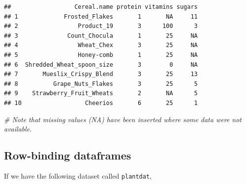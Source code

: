 \documentclass[]{book}
\newenvironment{Shaded}{\begin{snugshade}}{\end{snugshade}}
\newcommand{\CommentTok}[1]{\textcolor[rgb]{0.56,0.35,0.01}{\textit{#1}}}
\newcommand{\DataTypeTok}[1]{\textcolor[rgb]{0.13,0.29,0.53}{#1}}
\newcommand{\KeywordTok}[1]{\textcolor[rgb]{0.13,0.29,0.53}{\textbf{#1}}}
\newcommand{\NormalTok}[1]{#1}
\newcommand{\OperatorTok}[1]{\textcolor[rgb]{0.81,0.36,0.00}{\textbf{#1}}}
\newcommand{\StringTok}[1]{\textcolor[rgb]{0.31,0.60,0.02}{#1}}
\begin{document}
\begin{Shaded}
\end{Shaded}

\begin{verbatim}
##                  Cereal.name protein vitamins sugars
## 1             Frosted_Flakes       1       NA     11
## 2                 Product_19       3      100      3
## 3              Count_Chocula       1       25     NA
## 4                 Wheat_Chex       3       25     NA
## 5                 Honey-comb       1       25     NA
## 6  Shredded_Wheat_spoon_size       3        0     NA
## 7       Mueslix_Crispy_Blend       3       25     13
## 8          Grape_Nuts_Flakes       3       25      5
## 9    Strawberry_Fruit_Wheats       2       NA      5
## 10                  Cheerios       6       25      1
\end{verbatim}

\begin{Shaded}
\begin{Highlighting}[]
\CommentTok{# Note that missing values (NA) have been inserted where some data were not available.}
\end{Highlighting}
\end{Shaded}

\hypertarget{rbind}{%
\subsection{Row-binding dataframes}\label{rbind}}

If we have the following dataset called \texttt{plantdat},
\end{document}
